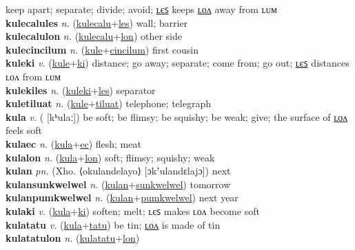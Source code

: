 keep apart; separate; divide; avoid; \hyperref[kulecalules]{ʟєꜱ} keeps \hyperref[kulecalulon]{ʟᴏᴧ} away from ʟᴜᴍ \label{kulecalu} \\
\textbf{kulecalules} \textit{n.} (\hyperref[kulecalu]{kulecalu}+\hyperref[les]{les})
wall; barrier \label{kulecalules} \\
\textbf{kulecalulon} \textit{n.} (\hyperref[kulecalu]{kulecalu}+\hyperref[lon]{lon})
other side \label{kulecalulon} \\
\textbf{kulecincilum} \textit{n.} (\hyperref[kule]{kule}+\hyperref[cincilum]{cincilum})
first cousin \label{kulecincilum} \\
\textbf{kuleki} \textit{v.} (\hyperref[kule]{kule}+\hyperref[ki]{ki})
distance; go away; separate; come from; go out; \hyperref[kulekiles]{ʟєꜱ} distances ʟᴏᴧ from ʟᴜᴍ \label{kuleki} \\
\textbf{kulekiles} \textit{n.} (\hyperref[kuleki]{kuleki}+\hyperref[les]{les})
separator \label{kulekiles} \\
\textbf{kuletiluat} \textit{n.} (\hyperref[kule]{kule}+\hyperref[tiluat]{tiluat})
telephone; telegraph \label{kuletiluat} \\
\textbf{kula} \textit{v.} ( [kʰulaː])
be soft; be flimsy; be squishy; be weak; give; the surface of \hyperref[kulalon]{ʟᴏᴧ} feels soft \label{kula} \\
\textbf{kulaec} \textit{n.} (\hyperref[kula]{kula}+\hyperref[ec]{ec})
flesh; meat \label{kulaec} \\
\textbf{kulalon} \textit{n.} (\hyperref[kula]{kula}+\hyperref[lon]{lon})
soft; flimsy; squishy; weak \label{kulalon} \\
\textbf{kulan} \textit{pn.} (Xho. ⟨okulandelayo⟩ [ɔkʼulandɛlajɔ])
next \label{kulan} \\
\textbf{kulansunkwelwel} \textit{n.} (\hyperref[kulan]{kulan}+\hyperref[sunkwelwel]{sunkwelwel})
tomorrow \label{kulansunkwelwel} \\
\textbf{kulanpumkwelwel} \textit{n.} (\hyperref[kulan]{kulan}+\hyperref[pumkwelwel]{pumkwelwel})
next year \label{kulanpumkwelwel} \\
\textbf{kulaki} \textit{v.} (\hyperref[kula]{kula}+\hyperref[ki]{ki})
soften; melt; ʟєꜱ makes ʟᴏᴧ become soft \label{kulaki} \\
\textbf{kulatatu} \textit{v.} (\hyperref[kula]{kula}+\hyperref[tatu]{tatu})
be tin; \hyperref[kulatatulon]{ʟᴏᴧ} is made of tin \label{kulatatu} \\
\textbf{kulatatulon} \textit{n.} (\hyperref[kulatatu]{kulatatu}+\hyperref[lon]{lon})
